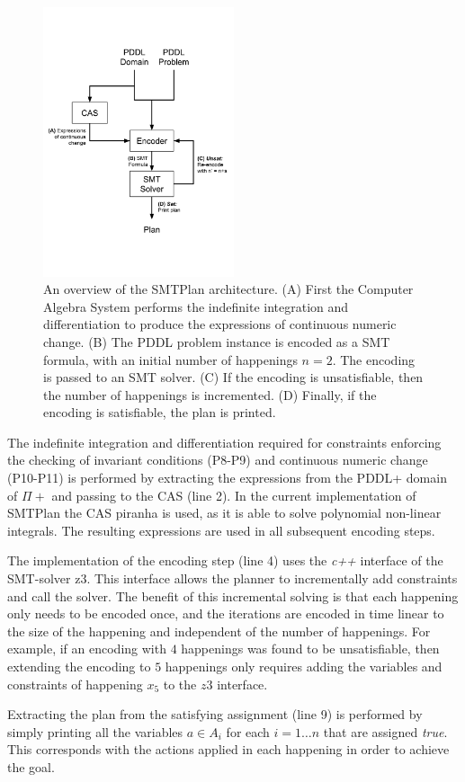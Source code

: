 \begin{figure}[ht]
\centering
\includegraphics[width=0.50\textwidth]{diagrams/architecture.pdf}
\caption{An overview of the SMTPlan architecture. (A) First the Computer Algebra System performs the indefinite integration and differentiation to produce the expressions of continuous numeric change. (B) The PDDL problem instance is encoded as a SMT formula, with an initial number of happenings $n=2$. The encoding is passed to an SMT solver. (C) If the encoding is unsatisfiable, then the number of happenings is incremented. (D) Finally, if the encoding is satisfiable, the plan is printed. }
\label{fig:SMTPlan}
\end{figure}

The indefinite integration and differentiation required for constraints enforcing the checking of invariant conditions (P8-P9) and continuous numeric change (P10-P11) is performed by extracting the expressions from the PDDL+ domain of $\Pi+$ and passing to the CAS (line 2). In the current implementation of SMTPlan the CAS piranha is used, as it is able to solve polynomial non-linear integrals. The resulting expressions are used in all subsequent encoding steps.

The implementation of the encoding step (line 4) uses the \textit{c++} interface of the SMT-solver z3. This interface allows the planner to incrementally add constraints and call the solver. The benefit of this incremental solving is that each happening only needs to be encoded once, and the iterations are encoded in time linear to the size of the happening and independent of the number of happenings. For example, if an encoding with $4$ happenings was found to be unsatisfiable, then extending the encoding to $5$ happenings only requires adding the variables and constraints of happening $x_5$ to the $z3$ interface.

Extracting the plan from the satisfying assignment (line 9) is performed by simply printing all the variables $a\in A_i$ for each $i=1\ldots n$ that are assigned \textit{true}. This corresponds with the actions applied in each happening in order to achieve the goal.

